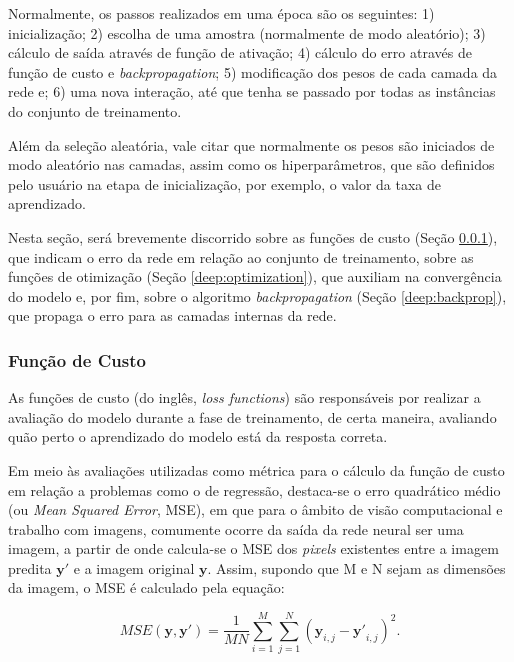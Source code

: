 Normalmente, os passos realizados em uma época são os seguintes: 1) inicialização; 2) escolha de uma amostra (normalmente de modo aleatório); 3) cálculo de saída através de função de ativação; 4) cálculo do erro através de função de custo e \textit{backpropagation}; 5) modificação dos pesos de cada camada da rede e; 6) uma nova interação, até que tenha se passado por todas as instâncias do conjunto de treinamento.

Além da seleção aleatória, vale citar que normalmente os pesos são iniciados de modo aleatório nas camadas, assim como os hiperparâmetros, que são definidos pelo usuário na etapa de inicialização, por exemplo, o valor da taxa de aprendizado.

Nesta seção, será brevemente discorrido sobre as funções de custo (Seção \ref{deep:cust}), que indicam o erro da rede em relação ao conjunto de treinamento, sobre as funções de otimização (Seção \ref{deep:optimization}), que auxiliam na convergência do modelo e, por fim, sobre o algoritmo \textit{backpropagation} (Seção \ref{deep:backprop}), que propaga o erro para as camadas internas da rede.


\subsubsection{Função de Custo}
\label{deep:cust}

As funções de custo (do inglês, \textit{loss functions}) são responsáveis por realizar a avaliação do modelo durante a fase de treinamento, de certa maneira, avaliando quão perto o aprendizado do modelo está da resposta correta.

Em meio às avaliações utilizadas como métrica para o cálculo da função de custo em relação a problemas como o de regressão, destaca-se o erro quadrático médio (ou \textit{Mean Squared Error}, MSE)\citep{Wang2004}, em que para o âmbito de visão computacional e trabalho com imagens, comumente ocorre da saída da rede neural ser uma imagem, a partir de onde calcula-se o MSE dos \textit{pixels} existentes entre a imagem predita $\boldsymbol{y'}$ e a imagem original $\boldsymbol{y}$. Assim, supondo que M e N sejam as dimensões da imagem, o MSE é calculado pela equação:

\begin{equation}
    \label{deep:eq:9}
    MSE(\boldsymbol{y}, \boldsymbol{y'}) = \frac{1}{MN} \sum_{i=1}^{M} \sum_{j=1}^{N} (\boldsymbol{y}_{i,j} - \boldsymbol{y'}_{i,j})^2.
\end{equation}

